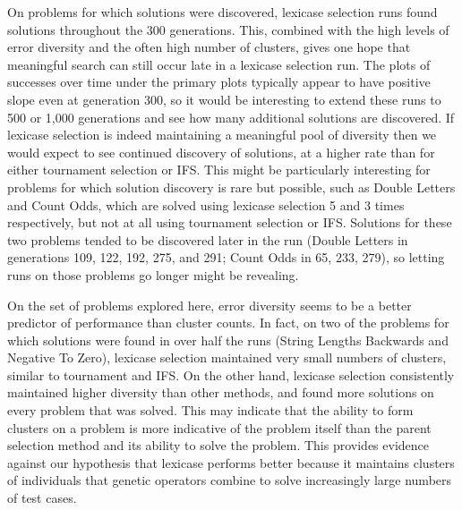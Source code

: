 On problems for which solutions were discovered, lexicase selection runs found solutions throughout the 300 generations. This, combined with the high levels of error diversity and the often 
high number of clusters, gives one hope that meaningful search can still occur late in a lexicase selection run. The plots of successes over time under the primary plots
typically appear to have positive slope even at generation 300, so it would be interesting to
extend these runs to 500 or 1,000 generations and see how many additional solutions are discovered.
If lexicase selection is indeed maintaining a meaningful pool of diversity then we would expect to see continued discovery of solutions, at a higher rate than for either tournament selection or IFS. This might be
particularly interesting for problems for which solution discovery is rare but possible, such as
Double Letters and Count Odds, which are solved using lexicase selection 5 and 3 times respectively, but not
at all using tournament selection or IFS. Solutions for these two problems tended to be discovered
later in the run (Double Letters in generations 109, 122, 192, 275, and 291; Count Odds in 65, 233, 279), so letting
runs on those problems go longer might be revealing.

On the set of problems explored here, error diversity seems to be a better predictor of performance than cluster counts. In fact, on two of the problems for which  solutions were found in over half the runs (String Lengths Backwards and Negative To Zero), lexicase selection maintained very small numbers of clusters, similar to tournament and IFS. 
On the other hand, lexicase selection consistently maintained higher diversity than other methods, and found more solutions on every problem that was solved. This may indicate that the ability to form clusters on a problem is more indicative of the problem itself than the parent selection method and its ability to solve the problem. This provides evidence against our hypothesis that lexicase performs better because it maintains clusters of individuals that genetic operators combine to solve increasingly large numbers of test cases.

